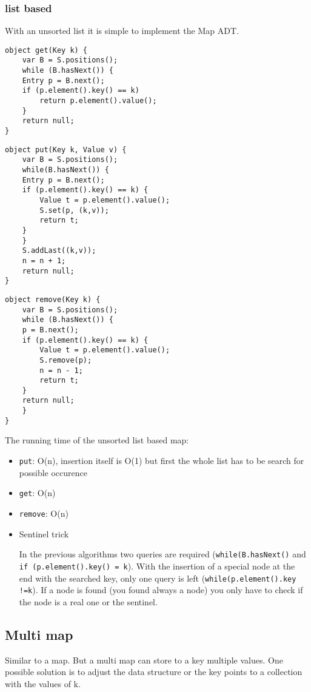 \documentclass[11pt,twoside,landscape]{article}
\begin{document}
\begin{multicols}{2}
\subsubsection*{list based}
\label{sec:org8e40038}
With an unsorted list it is simple to implement the Map ADT. 

\begin{verbatim}
object get(Key k) {
    var B = S.positions();
    while (B.hasNext()) {
	Entry p = B.next();
	if (p.element().key() == k)
	    return p.element().value();
    }
    return null;
}
\end{verbatim}

\begin{verbatim}
object put(Key k, Value v) {
    var B = S.positions();
    while(B.hasNext()) {
	Entry p = B.next();
	if (p.element().key() == k) {
	    Value t = p.element().value();
	    S.set(p, (k,v));
	    return t;
	}
    }
    S.addLast((k,v));
    n = n + 1;
    return null;
}
\end{verbatim}

\begin{verbatim}
object remove(Key k) {
    var B = S.positions();
    while (B.hasNext()) {
	p = B.next();
	if (p.element().key() == k) {
	    Value t = p.element().value();
	    S.remove(p);
	    n = n - 1;
	    return t;
	}
	return null;
    }
}
\end{verbatim}

The running time of the unsorted list based map:
\begin{itemize}
\item \texttt{put}: O(n), insertion itself is O(1) but first the whole list has to be search for possible occurence
\item \texttt{get}: O(n)
\item \texttt{remove}: O(n)
\end{itemize}

\begin{itemize}
\item Sentinel trick
\label{sec:org21a1f4c}

In the previous algorithms two queries are required (\texttt{while(B.hasNext()} and \texttt{if (p.element().key() = k}). With the insertion of a special node at the end with the searched key, only one query is left (\texttt{while(p.element().key !=k}). If a node is found (you found always a node) you only have to check if the node is a real one or the sentinel.
\end{itemize}

\subsection*{Multi map}
\label{sec:orgf2aa61d}
Similar to a map. But a multi map can store to a key multiple values. One possible solution is to adjust the data structure or the key points to a collection with the values of k.


\end{multicols}
\end{document}
